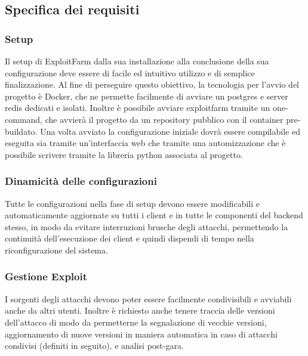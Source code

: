 \documentclass[11pt]{article}
\begin{document}
\subsection{Specifica dei requisiti}
\subsubsection{Setup}
Il setup di ExploitFarm dalla sua installazione alla conclusione della sua configurazione deve essere di facile ed intuitivo utilizzo e di semplice finalizzazione. Al fine di perseguire questo obiettivo, la tecnologia per l'avvio del progetto è Docker, che ne permette facilmente di avviare un postgres e server redis dedicati e isolati. Inoltre è possibile avviare exploitfarm tramite un one-command, che avvierà il progetto da un repository pubblico con il container pre-buildato. Una volta avviato la configurazione iniziale dovrà essere compilabile ed eseguita sia tramite un'interfaccia web che tramite una automizzazione che è possibile scrivere tramite la libreria python associata al progetto.
\subsubsection{Dinamicità delle configurazioni}
Tutte le configurazioni nella fase di setup devono essere modificabili e automaticamente aggiornate su tutti i client e in tutte le componenti del backend stesso, in modo da evitare interruzioni brusche degli attacchi, permettendo la continuità dell'esecuzione dei client e quindi dispendi di tempo nella riconfigurazione del sistema.
\subsubsection{Gestione Exploit}
I sorgenti degli attacchi devono poter essere facilmente condivisibili e avviabili anche da altri utenti. Inoltre è richiesto anche tenere traccia delle versioni dell'attacco di modo da permetterne la segnalazione di vecchie versioni, aggiornamento di nuove versioni in maniera automatica in caso di attacchi condivisi (definiti in seguito), e analisi post-gara.
\end{document}
